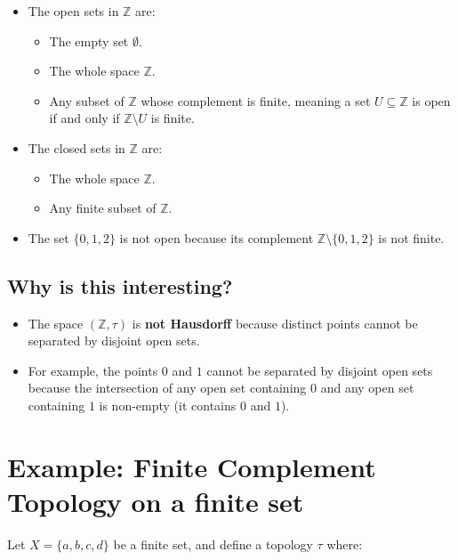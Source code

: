 \documentclass{article}
\begin{document}
\begin{itemize}
    \item The open sets in $\mathbb{Z}$ are:
    \begin{itemize}
        \item The empty set $\emptyset$.
        \item The whole space $\mathbb{Z}$.
        \item Any subset of $\mathbb{Z}$ whose complement is finite, meaning a set $U \subseteq
        \mathbb{Z}$ is open if and only if $\mathbb{Z} \setminus U$ is finite.
    \end{itemize}
    \item The closed sets in $\mathbb{Z}$ are:
    \begin{itemize}
        \item The whole space $\mathbb{Z}$.
        \item Any finite subset of $\mathbb{Z}$.
    \end{itemize}
\end{itemize}

\begin{itemize}
    \item The set $\{0,1,2\}$ is not open because its complement $\mathbb{Z}\setminus \{0,1,2\}$ is not finite.
\end{itemize}
\subsection{Why is this interesting?}
\begin{itemize}
    \item The space $(\mathbb{Z}, \tau)$ is \textbf{not Hausdorff} because
    distinct points cannot be separated by disjoint open sets.
    \item For example, the points $0$ and $1$ cannot be separated by disjoint open sets because
    the intersection of any open set containing $0$ and any open set containing $1$ is non-empty
    (it contains $0$ and $1$).
\end{itemize}

\section{Example: Finite Complement Topology on a finite set}
Let $X=\{a,b,c,d\}$ be a finite set, and define a topology $\tau$ where:
\end{document}
